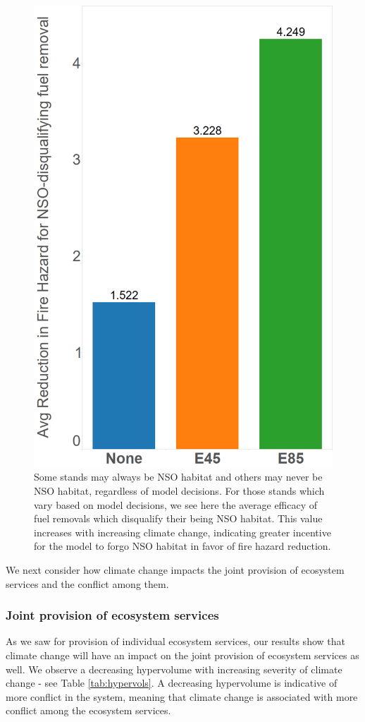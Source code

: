 \begin{figure}[ht]
\centering
\includegraphics[width=.5\textwidth]{../images/AvgFireHazardEffectivenessForNSODQs}
\caption[Efficacy of fuel removals for NSO habitat disqualification]{Some stands may always be NSO habitat and others may never be NSO habitat, regardless of model decisions. For those stands which vary based on model decisions, we see here the average efficacy of fuel removals which disqualify their being NSO habitat. This value increases with increasing climate change, indicating greater incentive for the model to forgo NSO habitat in favor of fire hazard reduction.}
\label{fig:nsoHabDQFHEfficacy}
\end{figure}

We next consider how climate change impacts the joint provision of ecosystem services and the conflict among them.

\subsubsection{Joint provision of ecosystem services}
As we saw for provision of individual ecosystem services, our results show that climate change will have an impact on the joint provision of ecosystem services as well. We observe a decreasing hypervolume with increasing severity of climate change - see Table \ref{tab:hypervols}. A decreasing hypervolume is indicative of more conflict in the system, meaning that climate change is associated with more conflict among the ecosystem services.

